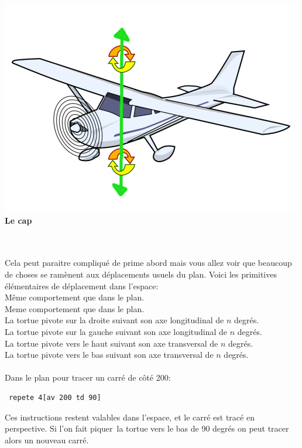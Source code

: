 \begin{minipage}{5.5cm}
\begin{center}
\includegraphics*[scale=0.3]{images/plane-heading.png}
\textbf{Le cap}
\end{center}
\end{minipage}\\ \\
Cela peut paraitre compliqué de prime abord mais vous allez voir que beaucoup de choses se ramènent aux déplacements usuels du plan. Voici les primitives élémentaires de déplacement dans l'espace:\\
Même comportement que dans le plan.\\
Meme comportement que dans le plan.\\
La tortue pivote sur la droite suivant son axe longitudinal de $n$ degrés.\\
La tortue pivote sur la gauche suivant son axe longitudinal de $n$ degrés.\\
La tortue pivote vers le haut suivant son axe transversal de $n$ degrés.\\
La tortue pivote vers le bas suivant son axe transversal de $n$ degrés.\\ \\ 
Dans le plan pour tracer un carré de côté 200:
\begin{verbatim}
 repete 4[av 200 td 90] 
\end{verbatim}
Ces instructions restent valables dans l'espace, et le carré est tracé en perspective. Si l'on fait \og piquer\fg\ la tortue vers le bas de 90 degrés on peut tracer alors un nouveau carré. \\
